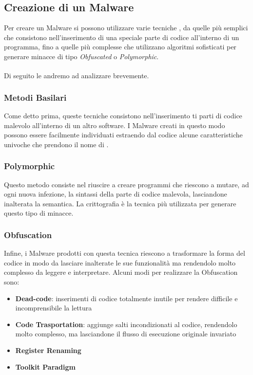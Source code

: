 \subsection{Creazione di un Malware}
Per creare un Malware si possono utilizzare varie tecniche \cite{malware}, da quelle più semplici che consistono nell'inserimento di una speciale parte di codice all'interno di un programma, fino a quelle più complesse che utilizzano algoritmi sofisticati per generare minacce di tipo \textit{Obfuscated} o \textit{Polymorphic}.\\
\\
Di seguito le andremo ad analizzare brevemente.

\subsubsection{Metodi Basilari}
Come detto prima, queste tecniche consistono nell'inserimento ti parti di codice malevolo all'interno di un altro software. I Malware creati in questo modo possono essere facilmente individuati estraendo dal codice alcune caratteristiche univoche che prendono il nome di .\\

\subsubsection{Polymorphic}
Questo metodo consiste nel riuscire a creare programmi che riescono a mutare, ad ogni nuova infezione, la sintassi della parte di codice malevola, lasciandone inalterata la semantica. La crittografia è la tecnica più utilizzata per generare questo tipo di minacce.

\subsubsection{Obfuscation}
Infine, i Malware prodotti con questa tecnica riescono a trasformare la forma del codice in modo da lasciare inalterate le sue funzionalità ma rendendolo molto complesso da leggere e interpretare.
Alcuni modi per realizzare la Obfuscation sono: 

\begin{itemize}
    \item \textbf{Dead-code}: inserimenti di codice totalmente inutile per rendere difficile e incomprensibile la lettura
    
    \item \textbf{Code Trasportation}: aggiunge salti incondizionati al codice, rendendolo molto complesso, ma lasciandone il flusso di esecuzione originale invariato
    
    \item \textbf{Register Renaming} 
    \item \textbf{Toolkit Paradigm}
\end{itemize}